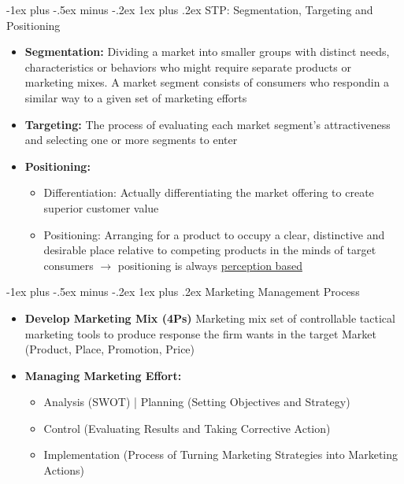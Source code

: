 \documentclass[10pt,landscape]{article}
\makeatletter
\newcommand{\subsubsubsection}{\@startsection{subsubsection}{3}{0mm}%
                                {-1ex plus -.5ex minus -.2ex}%
                                {1ex plus .2ex}%
                                {\normalfont\scriptsize\bfseries}}
\makeatother
\begin{document}
\begin{multicols*}{3}
\subsubsubsection{STP: Segmentation, Targeting and Positioning}
\begin{itemize}[topsep=0pt,noitemsep,wide=0pt, leftmargin=\dimexpr{} + 2\relax]
    \item \textbf{Segmentation:} Dividing a market into smaller groups with distinct needs, characteristics or behaviors who might require separate products or marketing mixes. A market segment consists of consumers who respondin a similar way to a given set of marketing efforts
    \item \textbf{Targeting:} The process of evaluating each market segment's attractiveness and selecting one or more segments to enter
    \item \textbf{Positioning:}
    \begin{itemize}[topsep=0pt,noitemsep,wide=0pt, leftmargin=\dimexpr{} + 2\relax]
        \item Differentiation: Actually differentiating the market offering to create superior customer value
        \item Positioning: Arranging for a product to occupy a clear, distinctive and desirable place relative to competing products in the minds of target consumers $\rightarrow$ positioning is always \underline{perception based}
    \end{itemize}
\end{itemize}

\subsubsubsection{Marketing Management Process}
\begin{itemize}[topsep=0pt,noitemsep,wide=0pt, leftmargin=\dimexpr{} + 2\relax]
    \item \textbf{Develop Marketing Mix (4Ps)} Marketing mix set of controllable tactical marketing tools to produce response the firm wants in the target Market (Product, Place, Promotion, Price)
    \item \textbf{Managing Marketing Effort:} 
    \begin{multicols}{2}
        \begin{itemize}[topsep=0pt,noitemsep,wide=0pt, leftmargin=\dimexpr{} + 2\relax]
            \item Analysis (SWOT) | Planning (Setting Objectives and Strategy)
            \item Control (Evaluating Results and Taking Corrective Action)
            \columnbreak
            \item Implementation (Process of Turning Marketing Strategies into Marketing Actions)
        \end{itemize}
    \end{multicols}
\end{itemize}


\end{multicols*}
\end{document}
